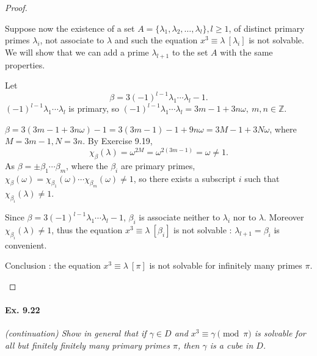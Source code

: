 \documentclass[11pt,a4paper]{article}
\newcommand{\Z}{\mathbb{Z}}
\begin{document}
\begin{proof}
\begin{enumerate}
Suppose now the existence of a set $A = \{\lambda_1,\lambda_2,\ldots,\lambda_l\}, l \geq 1$, of distinct primary primes $\lambda_i$, not associate to $\lambda$ and such the equation $x^3 \equiv \lambda\ [\lambda_i]$ is not solvable. We will show that we can add a prime $\lambda_{l+1}$  to the set $A$ with the same properties.

Let $$\beta = 3(-1)^{l-1} \lambda_1\cdots\lambda_l - 1.$$
$(-1)^{l-1} \lambda_1\cdots\lambda_l$ is primary, so $(-1)^{l-1} \lambda_1\cdots\lambda_l = 3m-1 + 3n\omega,\ m,n \in \Z$.

$\beta = 3(3m-1 + 3n\omega) - 1 = 3(3m-1) - 1 + 9n\omega = 3M-1 + 3 N \omega$, where $M = 3m-1, N = 3n$. By Exercise 9.19,
$$\chi_\beta(\lambda) = \omega^{2M} = \omega^{2(3m-1)} = \omega \neq 1.$$
As $\beta = \pm \beta_1\cdots\beta_m$, where the $\beta_i$ are primary primes, $\chi_\beta(\omega) = \chi_{\beta_1}(\omega) \cdots \chi_{\beta_m}(\omega) \neq 1$, so there exists a subscript $i$ such that $\chi_{\beta_i}(\lambda) \ne 1$. 

Since $\beta = 3(-1)^{l-1} \lambda_1\cdots\lambda_l - 1$, $\beta_i$ is associate neither to $\lambda_i$ nor to $\lambda$. Moreover $\chi_{\beta_i}(\lambda)\ne 1$, thus the equation $x^3 \equiv \lambda\ [\beta_i]$ is not solvable : $\lambda_{l+1} = \beta_i$ is convenient.

Conclusion : the equation $x^3 \equiv \lambda \ [\pi]$ is not solvable for infinitely many primes $\pi$.

\end{enumerate}
\end{proof}

\paragraph{Ex. 9.22}

{\it (continuation) Show in general that if $\gamma \in D$ and $x^3 \equiv \gamma \pmod \pi$ is solvable for all but finitely finitely many primary primes $\pi$, then $\gamma$ is a cube in $D$.
}
\end{document}
